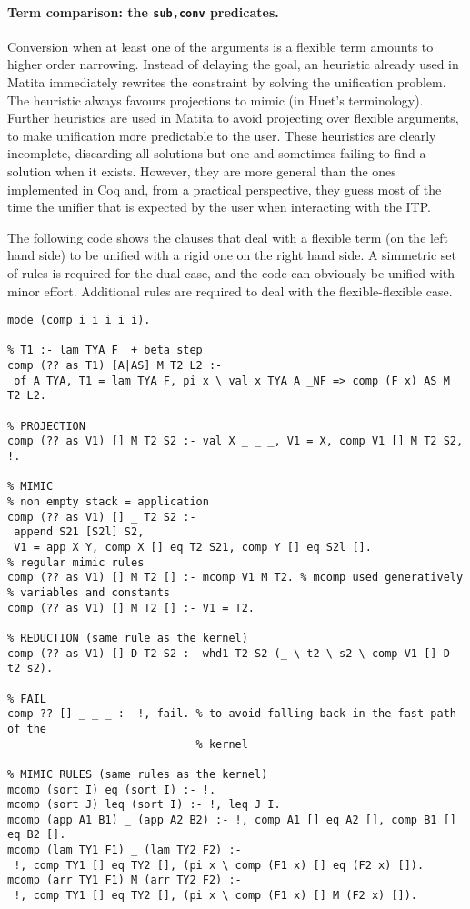 \documentclass{easychair}
\begin{document}
\paragraph{Term comparison: the \texttt{sub,conv} predicates.}

Conversion when at least one of the arguments is a flexible term amounts to higher order narrowing. Instead of delaying the goal, an heuristic already used in Matita immediately rewrites the constraint by solving the unification problem. The heuristic always favours projections to mimic (in Huet's terminology). Further heuristics are used in Matita to avoid projecting over flexible arguments, to make unification more predictable to the user. These heuristics are clearly incomplete, discarding all solutions but one and sometimes failing to find a solution when it exists. However, they are more general than the ones implemented in Coq and, from a practical perspective, they guess most of the time the unifier that is expected by the user when interacting with the ITP.

The following code shows the clauses that deal with a flexible term (on the left hand side) to be unified with a rigid one on the right hand side. A simmetric set of rules is required for the dual case, and the code can obviously be unified with minor effort. Additional rules are required to deal with the flexible-flexible case.

\begin{Verbatim}
mode (comp i i i i i).

% T1 :- lam TYA F  + beta step
comp (?? as T1) [A|AS] M T2 L2 :-
 of A TYA, T1 = lam TYA F, pi x \ val x TYA A _NF => comp (F x) AS M T2 L2.

% PROJECTION
comp (?? as V1) [] M T2 S2 :- val X _ _ _, V1 = X, comp V1 [] M T2 S2, !.

% MIMIC
% non empty stack = application
comp (?? as V1) [] _ T2 S2 :-
 append S21 [S2l] S2,
 V1 = app X Y, comp X [] eq T2 S21, comp Y [] eq S2l [].
% regular mimic rules
comp (?? as V1) [] M T2 [] :- mcomp V1 M T2. % mcomp used generatively
% variables and constants
comp (?? as V1) [] M T2 [] :- V1 = T2.

% REDUCTION (same rule as the kernel)
comp (?? as V1) [] D T2 S2 :- whd1 T2 S2 (_ \ t2 \ s2 \ comp V1 [] D t2 s2).

% FAIL
comp ?? [] _ _ _ :- !, fail. % to avoid falling back in the fast path of the
                             % kernel

% MIMIC RULES (same rules as the kernel)
mcomp (sort I) eq (sort I) :- !.
mcomp (sort J) leq (sort I) :- !, leq J I.
mcomp (app A1 B1) _ (app A2 B2) :- !, comp A1 [] eq A2 [], comp B1 [] eq B2 [].
mcomp (lam TY1 F1) _ (lam TY2 F2) :-
 !, comp TY1 [] eq TY2 [], (pi x \ comp (F1 x) [] eq (F2 x) []).
mcomp (arr TY1 F1) M (arr TY2 F2) :-
 !, comp TY1 [] eq TY2 [], (pi x \ comp (F1 x) [] M (F2 x) []).
\end{Verbatim}
\end{document}
